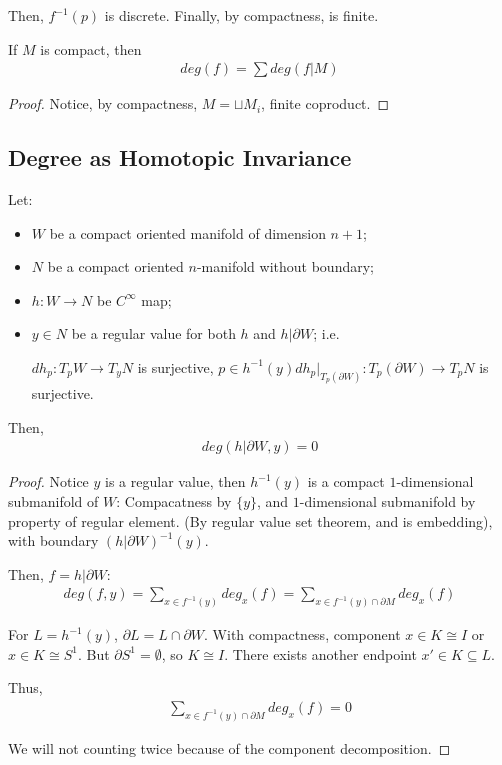 \documentclass[Total.tex]{subfiles}
\begin{document}
				Then, $f^{-1}(p)$ is discrete. Finally, by compactness, is finite.
				
				\begin{proposition}
					If $M$ is compact, then
					\begin{gather*}
						deg(f)=\sum deg(f|M)
					\end{gather*}
				\end{proposition}
				\begin{proof}
					Notice, by compactness, $M=\sqcup M_i$, finite coproduct.
				\end{proof}
				
				\subsection{Degree as Homotopic Invariance}
				
				\begin{proposition}
					Let: 
					\begin{itemize}
						\item $W$ be a compact oriented manifold of dimension $n+1$;
						\item $N$ be a compact oriented $n$-manifold without boundary;
						\item $h:W\rightarrow N$ be $C^\infty$ map;
						\item $y\in N$ be a regular value for both $h$ and $h|\partial W$; i.e.
						\begin{center}
							$dh_p:T_p W\rightarrow T_{y}N$ is surjective, $p\in h^{-1}(y)$\qquad $dh_p|_{T_p(\partial W)}:T_p(\partial W)\rightarrow T_p N$ is surjective. 
						\end{center}
					\end{itemize}
					
					Then,
					\begin{gather*}
						deg(h|\partial W,y)=0
					\end{gather*}
				\end{proposition}
				\begin{proof}
					Notice $y$ is a regular value, then $h^{-1}(y)$ is a compact $1$-dimensional submanifold of $W$: Compacatness by $\{y\}$, and $1$-dimensional submanifold by property of regular element. (By regular value set theorem, and is embedding), with boundary $(h|\partial W)^{-1}(y)$. 
					
					Then, $f=h|\partial W$:
					\begin{gather*}
						deg(f,y)=\sum_{x\in f^{-1}(y)} deg_x(f)=\sum_{x\in f^{-1}(y)\cap  \partial M} deg_x(f)
					\end{gather*}
					
					For $L=h^{-1}(y)$, $\partial L=L\cap \partial W$. With compactness, component $x\in K\cong I$ or $x\in K\cong S^1$. But $\partial S^1=\emptyset$, so $K\cong I$. There exists another endpoint $x'\in K\subseteq L$. 
					
					Thus, 
					\begin{gather*}
						\sum_{x\in f^{-1}(y)\cap \partial M} deg_x(f)=0
					\end{gather*}
					
					We will not counting twice because of the component decomposition. 
				\end{proof}
				
\end{document}

